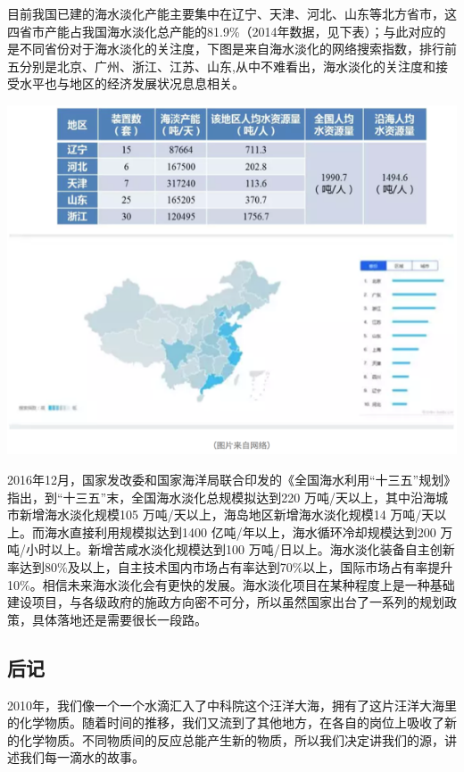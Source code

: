 \documentclass[
]{book}
\begin{document}
目前我国已建的海水淡化产能主要集中在辽宁、天津、河北、山东等北方省市，这四省市产能占我国海水淡化总产能的81.9\%（2014年数据，见下表）；与此对应的是不同省份对于海水淡化的关注度，下图是来自海水淡化的网络搜索指数，排行前五分别是北京、广州、浙江、江苏、山东,从中不难看出，海水淡化的关注度和接受水平也与地区的经济发展状况息息相关。

\includegraphics[width=8.33in]{images/seawater5}

2016年12月，国家发改委和国家海洋局联合印发的《全国海水利用``十三五''规划》指出，到``十三五''末，全国海水淡化总规模拟达到220 万吨/天以上，其中沿海城市新增海水淡化规模105 万吨/天以上，海岛地区新增海水淡化规模14 万吨/天以上。而海水直接利用规模拟达到1400 亿吨/年以上，海水循环冷却规模达到200 万吨/小时以上。新增苦咸水淡化规模达到100 万吨/日以上。海水淡化装备自主创新率达到80\%及以上，自主技术国内市场占有率达到70\%以上，国际市场占有率提升10\%。相信未来海水淡化会有更快的发展。海水淡化项目在某种程度上是一种基础建设项目，与各级政府的施政方向密不可分，所以虽然国家出台了一系列的规划政策，具体落地还是需要很长一段路。

\hypertarget{ux540eux8bb0}{%
\subsection{后记}\label{ux540eux8bb0}}

2010年，我们像一个一个水滴汇入了中科院这个汪洋大海，拥有了这片汪洋大海里的化学物质。随着时间的推移，我们又流到了其他地方，在各自的岗位上吸收了新的化学物质。不同物质间的反应总能产生新的物质，所以我们决定讲我们的源，讲述我们每一滴水的故事。
\end{document}
